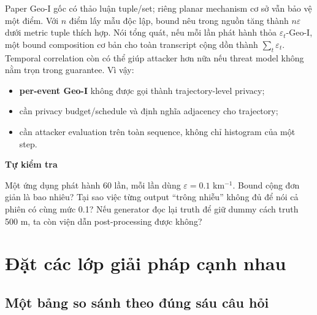 \documentclass[11pt,a4paper,oneside]{report}
\newenvironment{exercisebox}[1][Tự kiểm tra]{%
  \par\medskip\noindent\begin{lrbox}{\exercisestore}\begin{minipage}{.89\textwidth}
  {\sffamily\bfseries\color{amber}#1}\par\smallskip}{%
  \end{minipage}\end{lrbox}\begin{center}\setlength{\fboxsep}{7pt}%
  \fcolorbox{amber}{lightamber}{\usebox{\exercisestore}}\end{center}\medskip}
\begin{document}
Paper Geo-I gốc có thảo luận tuple/set; riêng planar mechanism cơ sở vẫn bảo vệ một
điểm. Với $n$ điểm lấy mẫu độc lập, bound nêu trong nguồn tăng thành $n\varepsilon$
dưới metric tuple thích hợp. Nói tổng quát, nếu mỗi lần phát hành thỏa
$\varepsilon_t$-Geo-I, một bound composition cơ bản cho toàn transcript cộng dồn
thành $\sum_t\varepsilon_t$. Temporal correlation còn có thể giúp attacker hơn nữa
nếu threat model không nằm trọn trong guarantee. Vì vậy:

\begin{itemize}
  \item \textbf{per-event Geo-I} không được gọi thành trajectory-level privacy;
  \item cần privacy budget/schedule và định nghĩa adjacency cho trajectory;
  \item cần attacker evaluation trên toàn sequence, không chỉ histogram của một step.
\end{itemize}

\begin{exercisebox}
Một ứng dụng phát hành 60 lần, mỗi lần dùng $\varepsilon=0.1$ km$^{-1}$. Bound cộng
đơn giản là bao nhiêu? Tại sao việc từng output ``trông nhiễu'' không đủ để nói cả
phiên có cùng mức 0.1? Nếu generator đọc lại truth để giữ dummy cách truth 500 m,
ta còn viện dẫn post-processing được không?
\end{exercisebox}


\chapter{Đặt các lớp giải pháp cạnh nhau}

\section{Một bảng so sánh theo đúng sáu câu hỏi}
\end{document}
